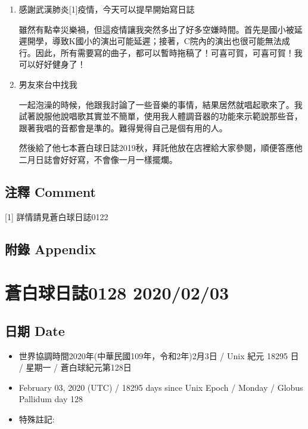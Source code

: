 \documentclass[
]{article}
\providecommand{\tightlist}{%
  \setlength{\itemsep}{0pt}\setlength{\parskip}{0pt}}
\begin{document}
\begin{enumerate}
\def\labelenumi{\arabic{enumi}.}
\item
  感謝武漢肺炎{[}1{]}疫情，今天可以提早開始寫日誌

  雖然有點幸災樂禍，但這疫情讓我突然多出了好多空嫌時間。首先是國小被延遲開學，導致K國小的演出可能延遲；接著，C院內的演出也很可能無法成行。因此，所有需要寫的曲子，都可以暫時拖稿了！可喜可賀，可喜可賀！我可以好好健身了！
\item
  男友來台中找我

  一起泡澡的時候，他跟我討論了一些音樂的事情，結果居然就唱起歌來了。我試著說服他說唱歌其實並不簡單，使用我人體調音器的功能來示範說那些音，跟著我唱的音都會是準的。難得覺得自己是個有用的人。

  然後給了他七本蒼白球日誌2019秋，拜託他放在店裡給大家參閱，順便答應他二月日誌會好好寫，不會像一月一樣擺爛。
\end{enumerate}

\hypertarget{ux6ce8ux91cb-comment-1}{%
\subsection{注釋 Comment}\label{ux6ce8ux91cb-comment-1}}

{[}1{]} 詳情請見蒼白球日誌0122

\hypertarget{ux9644ux9304-appendix-1}{%
\subsection{附錄 Appendix}\label{ux9644ux9304-appendix-1}}

\hypertarget{ux84bcux767dux7403ux65e5ux8a8c0128-20200203}{%
\section{蒼白球日誌0128
2020/02/03}\label{ux84bcux767dux7403ux65e5ux8a8c0128-20200203}}

\hypertarget{ux65e5ux671f-date-2}{%
\subsection{日期 Date}\label{ux65e5ux671f-date-2}}

\begin{itemize}
\tightlist
\item
  世界協調時間2020年(中華民國109年，令和2年)2月3日 / Unix 紀元 18295 日
  / 星期一 / 蒼白球紀元第128日
\item
  February 03, 2020 (UTC) / 18295 days since Unix Epoch / Monday /
  Globus Pallidum day 128
\item
  特殊註記:
\end{itemize}
\end{document}
